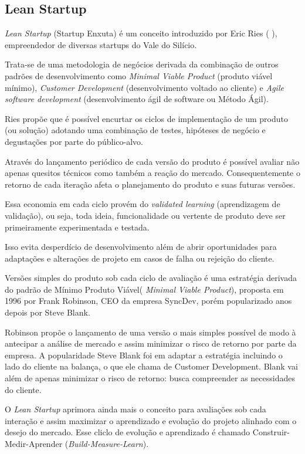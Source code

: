 \subsection{Lean Startup}
\par \emph{Lean Startup} (Startup Enxuta) é um conceito introduzido por Eric Ries ( \cite{ries:11}), empreendedor de diversas startups do Vale do Silício.
\par Trata-se de uma metodologia de negócios derivada da combinação de outros padrões de desenvolvimento como \emph{Minimal Viable Product} (produto viável mínimo), \emph{Customer Development} (desenvolvimento voltado ao cliente) e \emph{Agile software development} (desenvolvimento ágil de software ou Método Ágil).
\par Ries propõe que é possível encurtar os ciclos de implementação de um produto (ou solução) adotando uma combinação de testes, hipóteses de negócio e degustações por parte do público-alvo.
\par Através do lançamento periódico de cada versão do produto é possível avaliar não apenas quesitos técnicos como também a reação do mercado. Consequentemente o retorno de cada iteração afeta o planejamento do produto e suas futuras versões. 
\par Essa economia em cada ciclo provém do \emph{validated learning} (aprendizagem de validação), ou seja, toda ideia, funcionalidade ou vertente de produto deve ser primeiramente experimentada e testada.
\par Isso evita desperdício de desenvolvimento além de  abrir oportunidades para adaptações e alterações de projeto em casos de falha ou rejeição do cliente.
\par Versões simples do produto sob cada ciclo de avaliação é uma estratégia derivada do padrão de Mínimo Produto Viável( \emph{Minimal Viable Product}), proposta em 1996 por Frank Robinson, CEO da empresa SyncDev, porém popularizado anos depois por Steve Blank.
\par Robinson propõe o lançamento de uma versão o mais simples possível de modo à antecipar a análise de mercado e assim minimizar o risco de retorno por parte da empresa. A popularidade Steve Blank foi em adaptar a estratégia incluindo o lado do cliente na balança, o que ele chama de Customer Development. Blank vai além de apenas minimizar o risco de retorno: busca compreender as necessidades do cliente. 
\par O \emph{Lean Startup} aprimora ainda mais o conceito para avaliações sob cada interação e assim maximizar o aprendizado e evolução do projeto alinhado com o desejo do mercado. Esse cliclo de evolução e aprendizado é  chamado Construir-Medir-Aprender (\emph{Build-Measure-Learn}).


